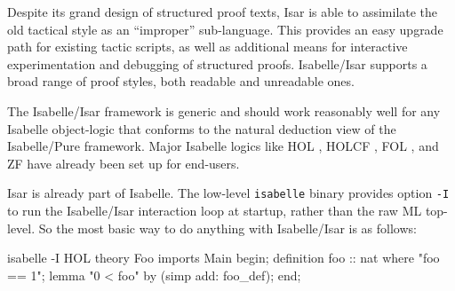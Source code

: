 \begin{isabellebody}
\begin{isamarkuptext}
  Despite its grand design of structured proof texts, Isar is able to
  assimilate the old tactical style as an ``improper'' sub-language.
  This provides an easy upgrade path for existing tactic scripts, as
  well as additional means for interactive experimentation and
  debugging of structured proofs.  Isabelle/Isar supports a broad
  range of proof styles, both readable and unreadable ones.

  \medskip The Isabelle/Isar framework is generic and should work
  reasonably well for any Isabelle object-logic that conforms to the
  natural deduction view of the Isabelle/Pure framework.  Major
  Isabelle logics like HOL \cite{isabelle-HOL}, HOLCF
  \cite{MuellerNvOS99}, FOL \cite{isabelle-logics}, and ZF
  \cite{isabelle-ZF} have already been set up for end-users.%
\end{isamarkuptext}%
\isamarkuptrue%
%
\isamarkuptrue%
%
\isamarkuptrue%
%
\begin{isamarkuptext}%
Isar is already part of Isabelle.  The low-level \verb|isabelle| binary provides option \verb|-I| to run the
  Isabelle/Isar interaction loop at startup, rather than the raw ML
  top-level.  So the most basic way to do anything with Isabelle/Isar
  is as follows:
\begin{ttbox}  %
isabelle -I HOL\medskip
{}\medskip
theory Foo imports Main begin;
definition foo :: nat where "foo == 1";
lemma "0 < foo" by (simp add: foo_def);
end;
\end{ttbox}


\end{isamarkuptext}
\end{isabellebody}
